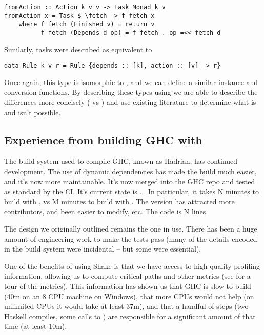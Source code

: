 {\begin{verbatim}
fromAction :: Action k v v -> Task Monad k v
fromAction x = Task $ \fetch -> f fetch x
    where f fetch (Finished v) = return v
          f fetch (Depends d op) = f fetch . op =<< fetch d
\end{verbatim}

\noindent Similarly, \Make tasks were described as equivalent to

\begin{verbatim}
data Rule k v r = Rule {depends :: [k], action :: [v] -> r}
\end{verbatim}

Once again, this type is isomorphic to , and we can define a similar  instance and conversion functions. By describing these types using  we are able to describe the differences more concisely ( vs ) and use existing literature to determine what is and isn't possible.

\subsection{Experience from building GHC with \Shake}


The build system used to compile GHC, known as Hadrian, has continued development. The use of dynamic dependencies has made the build much easier, and it's now more maintainable. It's now merged into the GHC repo and tested as standard by the CI. It's current state is ... In particular, it takes N minutes to build with \Shake, vs M minutes to build with \Make. The \Shake version has attracted more contributors, and been easier to modify, etc. The code is N lines.

The design we originally outlined remains the one in use. There has been a huge amount of engineering work to make the tests pass (many of the details encoded in the \Make build system were incidental -- but some were essential).

One of the benefits of using Shake is that we have access to high quality profiling information, allowing us to compute critical paths and other metrics (see \cite{mitchell2019ghcrebuildtimes} for a tour of the metrics). This information has shown us that GHC is slow to build (40m on an 8 CPU machine on Windows), that more CPUs would not help (on unlimited CPUs it would take at least 37m), and that a handful of steps (two Haskell compiles, some calls to ) are responsible for a significant amount of that time (at least 10m).

}
